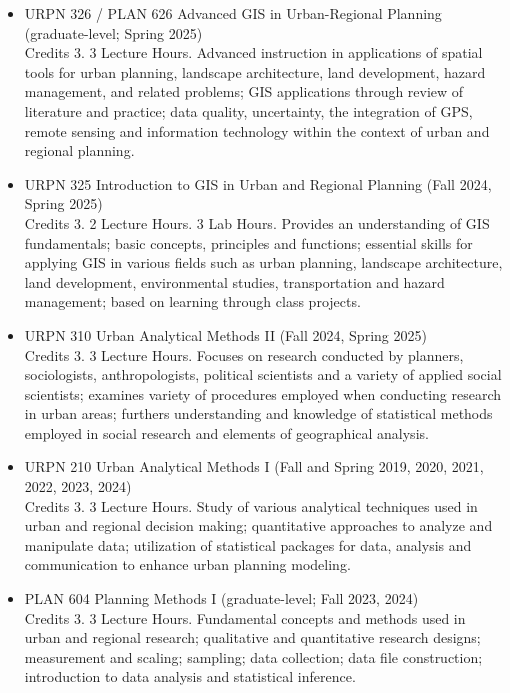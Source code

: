 \documentclass[11pt,oneside]{article}
\begin{document}
\begin{itemize}[leftmargin=40pt, label={-}]
\item {\frutigerregular URPN 326 / PLAN 626 Advanced GIS in Urban-Regional Planning} (graduate-level; Spring 2025)\\
      Credits 3. 3 Lecture Hours. Advanced instruction in applications of spatial tools for urban planning, landscape architecture, land development, hazard management, and related problems; GIS applications through review of literature and practice; data quality, uncertainty, the integration of GPS, remote sensing and information technology within the context of urban and regional planning.
\item {\frutigerregular URPN 325 Introduction to GIS in Urban and Regional Planning} (Fall 2024, Spring 2025)\\
      Credits 3. 2 Lecture Hours. 3 Lab Hours. Provides an understanding of GIS fundamentals; basic concepts, principles and functions; essential skills for applying GIS in various fields such as urban planning, landscape architecture, land development, environmental studies, transportation and hazard management; based on learning through class projects.
\item {\frutigerregular URPN 310 Urban Analytical Methods II} (Fall 2024, Spring 2025)\\
      Credits 3. 3 Lecture Hours. Focuses on research conducted by planners, sociologists, anthropologists, political scientists and a variety of applied social scientists; examines variety of procedures employed when conducting research in urban areas; furthers understanding and knowledge of statistical methods employed in social research and elements of geographical analysis.
\item {\frutigerregular URPN 210 Urban Analytical Methods I} (Fall and Spring 2019, 2020, 2021, 2022, 2023, 2024)\\
      Credits 3. 3 Lecture Hours. Study of various analytical techniques used in urban and regional decision making; quantitative approaches to analyze and manipulate data; utilization of statistical packages for data, analysis and communication to enhance urban planning modeling.
\item {\frutigerregular PLAN 604 Planning Methods I} (graduate-level; Fall 2023, 2024)\\
      Credits 3. 3 Lecture Hours. Fundamental concepts and methods used in urban and regional research; qualitative and quantitative research designs; measurement and scaling; sampling; data collection; data file construction; introduction to data analysis and statistical inference.

\end{itemize}
\end{document}
